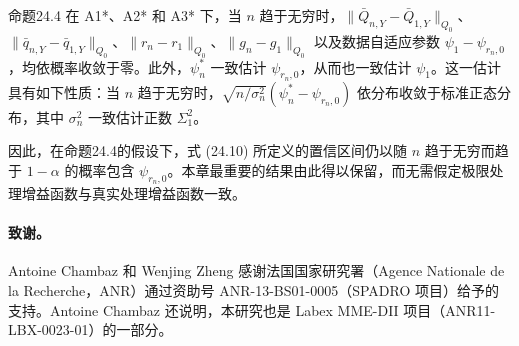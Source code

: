 \begin{bookresult}{命题}{24.4}
在 A1*、A2* 和 A3* 下，当 $n$ 趋于无穷时，$\|\bar Q_{n,Y}-\bar Q_{1,Y}\|_{Q_0}$、$\|\bar q_{n,Y}-\bar q_{1,Y}\|_{Q_0}$、$\|r_n-r_1\|_{Q_0}$、$\|g_n-g_1\|_{Q_0}$ 以及数据自适应参数 $\psi_1-\psi_{r_n,0}$，均依概率收敛于零。此外，$\psi_n^*$ 一致估计 $\psi_{r_n,0}$，从而也一致估计 $\psi_1$。这一估计具有如下性质：当 $n$ 趋于无穷时，$\sqrt{n/\sigma_n^2}(\psi_n^*-\psi_{r_n,0})$ 依分布收敛于标准正态分布，其中 $\sigma_n^2$ 一致估计正数 $\Sigma_1^2$。
\end{bookresult}

因此，在命题24.4的假设下，式 (24.10) 所定义的置信区间仍以随 $n$ 趋于无穷而趋于 $1-\alpha$ 的概率包含 $\psi_{r_n,0}$。本章最重要的结果由此得以保留，而无需假定极限处理增益函数与真实处理增益函数一致。

\paragraph*{致谢。}
Antoine Chambaz 和 Wenjing Zheng 感谢法国国家研究署（Agence Nationale de la Recherche，ANR）通过资助号 ANR-13-BS01-0005（SPADRO 项目）给予的支持。Antoine Chambaz 还说明，本研究也是 Labex MME-DII 项目（ANR11-LBX-0023-01）的一部分。
